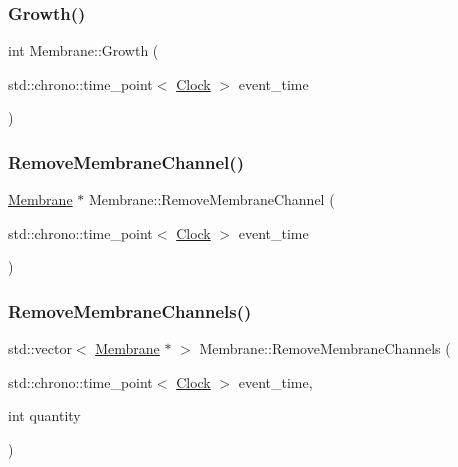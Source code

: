 \mbox{\label{classMembrane_a544742864485b9ac052f3b241ae5c6b4}} 
\subsubsection{\texorpdfstring{Growth()}{Growth()}}
{\footnotesize\ttfamily int Membrane\+::\+Growth (\begin{DoxyParamCaption}\item[{std\+::chrono\+::time\+\_\+point$<$ \mbox{\hyperlink{universe_8h_a0ef8d951d1ca5ab3cfaf7ab4c7a6fd80}{Clock}} $>$}]{event\+\_\+time }\end{DoxyParamCaption})}

\mbox{\label{classMembrane_a36d6927c8869cc752b55623dac661107}} 
\subsubsection{\texorpdfstring{Remove\+Membrane\+Channel()}{RemoveMembraneChannel()}}
{\footnotesize\ttfamily \mbox{\hyperlink{classMembrane}{Membrane}} $\ast$ Membrane\+::\+Remove\+Membrane\+Channel (\begin{DoxyParamCaption}\item[{std\+::chrono\+::time\+\_\+point$<$ \mbox{\hyperlink{universe_8h_a0ef8d951d1ca5ab3cfaf7ab4c7a6fd80}{Clock}} $>$}]{event\+\_\+time }\end{DoxyParamCaption})}

\mbox{\label{classMembrane_ac33ffd86416112420dc5b0576287c44d}} 
\subsubsection{\texorpdfstring{Remove\+Membrane\+Channels()}{RemoveMembraneChannels()}}
{\footnotesize\ttfamily std\+::vector$<$ \mbox{\hyperlink{classMembrane}{Membrane}} $\ast$ $>$ Membrane\+::\+Remove\+Membrane\+Channels (\begin{DoxyParamCaption}\item[{std\+::chrono\+::time\+\_\+point$<$ \mbox{\hyperlink{universe_8h_a0ef8d951d1ca5ab3cfaf7ab4c7a6fd80}{Clock}} $>$}]{event\+\_\+time,  }\item[{int}]{quantity }\end{DoxyParamCaption})}

